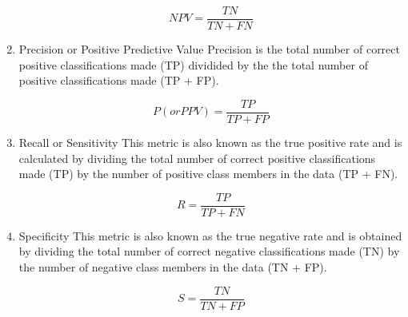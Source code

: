 \begin{enumerate}
    \begin{equation}
        NPV = \frac{TN}{TN+FN}
    \end{equation}
    
    \item{Precision or Positive Predictive Value}
    Precision is the total number of correct positive classifications made (TP) dividided by the the total number of positive classifications made (TP + FP).
    
    \begin{equation}
        P (or PPV) = \frac{TP}{TP + FP}
    \end{equation}
    
    \item{Recall or Sensitivity}
    This metric is also known as the true positive rate and is calculated by dividing the total number of correct positive classifications made (TP) by the number of positive class members in the data (TP + FN).
    
    \begin{equation}
        R = \frac{TP}{TP+FN}
    \end{equation}
    
    \item{Specificity}
    This metric is also known as the true negative rate and is obtained by dividing the total number of correct negative classifications made (TN) by the number of negative class members in the data (TN + FP).
    
    \begin{equation}
        S = \frac{TN}{TN+FP}
    \end{equation}
    
\end{enumerate}


